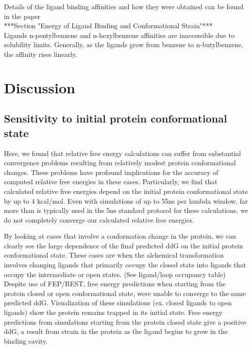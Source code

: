\documentclass{article}
\begin{document}
Details of the ligand binding affinities and how they were obtained can be found in the paper \cite{Merski2015} \\
***Section "Energy of Ligand Binding and Conformational Strain"***\\
Ligands n-pentylbenzene and n-hexylbenzene affinities are inaccessible due to solubility limits.
Generally, as the ligands grow from benzene to n-butylbenzene, the affinity rises linearly.

\section{Discussion}
\subsection*{Sensitivity to initial protein conformational state}
Here, we found that relative free energy calculations can suffer from substantial convergence problems resulting from relatively modest protein conformational changes.
These problems have profound implications for the accuracy of computed relative free energies in these cases. 
Particularly, we find that calculated relative free energies depend on the initial protein conformational state by up to 4 kcal/mol. 
Even with simulations of up to 55ns per lambda window, far more than is typically used in the 5ns standard protocol for these calculations, we do not completely converge our calculated relative free energies.
 
By looking at cases that involve a conformation change in the protein, we can clearly see the large dependence of the final predicted ddG on the initial protein conformational state.
These cases are when the alchemical transformation involves changing ligands that primarily occupy the closed state into ligands that occupy the intermediate or open states. (See ligand/loop occupancy table)
Despite use of FEP/REST, free energy predictions when starting from the protein closed or open conformational state, were unable to converge to the same predicted ddG.
Visualization of these simulations (ex. closed ligands to open ligands) show the protein remains trapped in its initial state.
Free energy predictions from simulations starting from the protein closed state give a positive ddG, a result from strain in the protein as the ligand begins to grow in the binding cavity.
\end{document}
